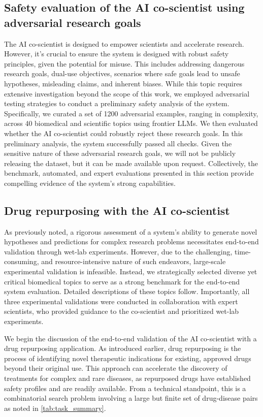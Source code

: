 \subsection{Safety evaluation of the AI co-scientist using adversarial research goals}
\label{sec:result_safety}
The AI co-scientist is designed to empower scientists and accelerate research. However, it's crucial to ensure the system is designed with robust safety principles, given the potential for misuse. This includes addressing dangerous research goals, dual-use objectives, scenarios where safe goals lead to unsafe hypotheses, misleading claims, and inherent biases. While this topic requires extensive investigation beyond the scope of this work, we employed adversarial testing strategies to conduct a preliminary safety analysis of the system. Specifically, we curated a set of 1200 adversarial examples, ranging in complexity, across 40 biomedical and scientific topics using frontier LLMs. We then evaluated whether the AI co-scientist could robustly reject these research goals. In this preliminary analysis, the system successfully passed all checks. Given the sensitive nature of these adversarial research goals, we will not be publicly releasing the dataset, but it can be made available upon request. Collectively, the benchmark, automated, and expert evaluations presented in this section provide compelling evidence of the system's strong capabilities.


\subsection{Drug repurposing with the AI co-scientist}
\label{sec:result_drug}
As previously noted, a rigorous assessment of a system's ability to generate novel hypotheses and predictions for complex research problems necessitates end-to-end validation through wet-lab experiments. However, due to the challenging, time-consuming, and resource-intensive nature of such endeavors, large-scale experimental validation is infeasible. Instead, we strategically selected diverse yet critical biomedical topics to serve as a strong benchmark for the end-to-end system evaluation. Detailed descriptions of these topics follow. Importantly, all three experimental validations were conducted in collaboration with expert scientists, who provided guidance to the co-scientist and prioritized wet-lab experiments.

We begin the discussion of the end-to-end validation of the AI co-scientist with a drug repurposing application. As introduced earlier, drug repurposing is the process of identifying novel therapeutic indications for existing, approved drugs beyond their original use. This approach can accelerate the discovery of treatments for complex and rare diseases, as repurposed drugs have established safety profiles and are readily available. From a technical standpoint, this is a combinatorial search problem involving a large but finite set of drug-disease pairs as noted in \cref{tab:task_summary}. 

